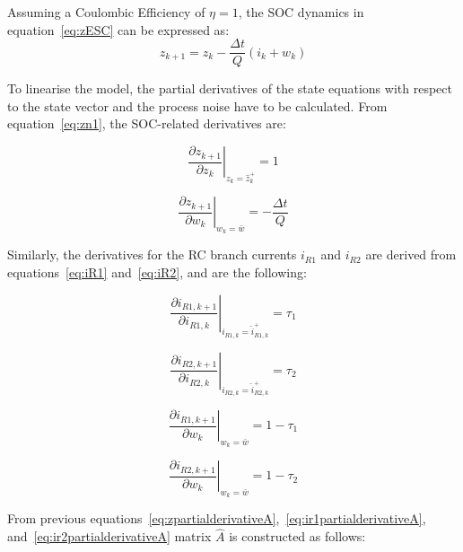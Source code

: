 Assuming a Coulombic Efficiency of $\eta = 1$, the \acs{SOC} dynamics in equation~\eqref{eq:zESC} can be expressed as:
\\
\begin{equation}
    z_{k+1} = z_k - \frac{\Delta t}{Q}(i_k + w_k)
    \label{eq:zn1}
\end{equation}

To linearise the model, the partial derivatives of the state equations with respect to the state vector and the process noise 
have to be calculated. From equation~\eqref{eq:zn1}, the \acs{SOC}-related derivatives are:

\begin{equation}
    \left. \frac{\partial z_{k+1}}{\partial z_k} \right|_{z_k = \hat{z}_k^+} = 1
    \label{eq:zpartialderivativeA}
\end{equation}

\begin{equation}
    \left. \frac{\partial z_{k+1}}{\partial w_k} \right|_{w_k = \bar{w}} = - \frac{\Delta t}{Q}
    \label{eq:zpartialderivativeB}
\end{equation}

Similarly, the derivatives for the RC branch currents $i_{R1}$ and $i_{R2}$ are derived from equations~\eqref{eq:iR1}
and~\eqref{eq:iR2}, and are the following:

\begin{equation}
    \left. \frac{\partial i_{R1,k+1}}{\partial i_{R1,k}} \right|_{i_{R1,k} = \hat{i}_{R1,k}^+} = \tau_1
    \label{eq:ir1partialderivativeA}
\end{equation}

\begin{equation}
    \left. \frac{\partial i_{R2,k+1}}{\partial i_{R2,k}} \right|_{i_{R2,k} = \hat{i}_{R2,k}^+} = \tau_2
    \label{eq:ir2partialderivativeA}
\end{equation}

\begin{equation}
    \left. \frac{\partial i_{R1,k+1}}{\partial w_k} \right|_{w_k = \bar{w}} = 1-\tau_1
    \label{eq:ir1partialderivativeB}
\end{equation}

\begin{equation}
    \left. \frac{\partial i_{R2,k+1}}{\partial w_k} \right|_{w_k = \bar{w}} = 1-\tau_2
    \label{eq:ir2partialderivativeB}
\end{equation}

From previous equations~\eqref{eq:zpartialderivativeA},~\eqref{eq:ir1partialderivativeA}, and~\eqref{eq:ir2partialderivativeA} 
matrix $\hat{A}$ is constructed as follows:

